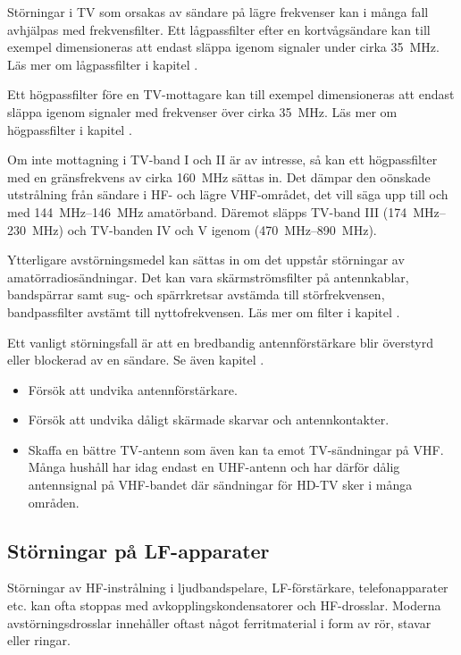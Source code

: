 Störningar i TV som orsakas av sändare på lägre frekvenser kan i många fall
avhjälpas med frekvensfilter.
Ett lågpassfilter efter en kortvågsändare kan till exempel dimensioneras att
endast släppa igenom signaler under cirka \qty{35}{\mega\hertz}.
Läs mer om lågpassfilter i kapitel .

Ett högpassfilter före en TV-mottagare kan till exempel dimensioneras att
endast släppa igenom signaler med frekvenser över cirka \qty{35}{\mega\hertz}.
Läs mer om högpassfilter i kapitel .

Om inte mottagning i TV-band I och II är av intresse, så kan ett högpassfilter
med en gränsfrekvens av cirka \qty{160}{\mega\hertz} sättas in.
Det dämpar den oönskade utstrålning från sändare i HF- och lägre VHF-området,
det vill säga upp till och med \SIrange{144}{146}{\mega\hertz} amatörband.
Däremot släpps TV-band III (\SIrange{174}{230}{\mega\hertz}) och TV-banden IV
och V igenom (\SIrange{470}{890}{\mega\hertz}).

Ytterligare avstörningsmedel kan sättas in om det uppstår störningar av
amatörradiosändningar.
Det kan vara skärmströmsfilter på antennkablar, bandspärrar samt sug- och
spärrkretsar avstämda till störfrekvensen, bandpassfilter avstämt till
nyttofrekvensen. Läs mer om filter i kapitel .

Ett vanligt störningsfall är att en bredbandig antennförstärkare blir
överstyrd eller blockerad av en sändare. Se även kapitel .

\begin{itemize}
\item Försök att undvika antennförstärkare.
\item Försök att undvika dåligt skärmade skarvar och antennkontakter.
\item Skaffa en bättre TV-antenn som även kan ta emot TV-sändningar på VHF.
  Många hushåll har idag endast en UHF-antenn och har därför dålig
  antennsignal på VHF-bandet där sändningar för HD-TV sker i många områden.
\end{itemize}

\subsection{Störningar på LF-apparater}

Störningar av HF-instrålning i ljudbandspelare, LF-förstärkare, telefonapparater
etc. kan ofta stoppas med avkopplingskondensatorer och HF-drosslar.
Moderna avstörningsdrosslar innehåller oftast något ferritmaterial i form av
rör, stavar eller ringar.
